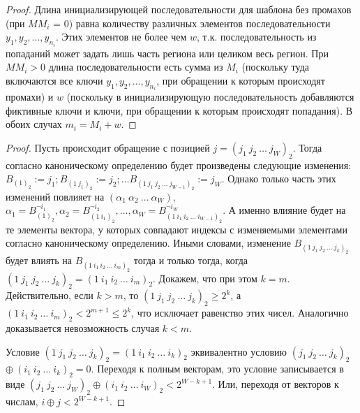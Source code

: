 \begin{proof}
  Длина инициализирующей последовательности для шаблона без промахов (при $MM_i$ = 0) равна количеству различных элементов последовательности $y_1, y_2, ..., y_{n_i}$. Этих элементов не более чем $w$,
  т.к. последовательность из попаданий может задать лишь часть региона
  или целиком весь регион. При $MM_i > 0$ длина последовательности
  есть сумма из $M_i$ (поскольку туда включаются все ключи $y_1, y_2,
  ..., y_{n_i}$, при обращении к которым происходят промахи) и
  $w$ (поскольку в инициализирующую последовательность добавляются фиктивные ключи и ключи, при обращении к которым происходят попадания). В обоих случах $m_i = M_i + w$.
\end{proof}

\theoremtext{\ref{thm_pseudoLRU_invariant}}{\PseudoLRUInvariant}
\begin{proof}
  Пусть происходит обращение с позицией $j = (j_1~j_2~\dots~j_W)_2$.
  Тогда согласно каноническому определению \PseudoLRU будет
  произведены следующие изменения: $B_{(1)_2} := j_1; B_{(1~j_1)_2} := j_2; \dots B_{(1~j_1~j_2~\dots~j_{W-1})_2} := j_W$. Однако только часть этих изменений повлияет на
  $(\alpha_1~\alpha_2~\dots~\alpha_W)$, $\alpha_1 = B_{(1)_2}^{\neg i_1}, \alpha_2 = B_{(1~i_1)_2}^{\neg i_2}, \dots, \alpha_W = B_{(1~i_1~i_2~\dots~i_{W-1})_2}^{\neg i_W}$. А именно влияние будет на те элементы вектора, у которых совпадают индексы с изменяемыми элементами согласно каноническому определению. Иными словами,
  изменение $B_{(1~j_1~j_2~\dots~j_k)_2}$ будет влиять на
  $B_{(1~i_1~i_2~\dots~i_m)_2}$ тогда и только тогда, когда
  $(1~j_1~j_2~\dots~j_k)_2 = (1~i_1~i_2~\dots~i_m)_2$. Докажем, что при этом $k = m$. Действительно, если $k > m$, то
  $(1~j_1~j_2~\dots~j_k)_2 \geqslant 2^k$, а $(1~i_1~i_2~\dots~i_m)_2 < 2^{m+1} \leqslant 2^k$, что исключает равенство этих чисел.
  Аналогично доказывается невозможность случая $k < m$.

  Условие $(1~j_1~j_2~\dots~j_k)_2 = (1~i_1~i_2~\dots~i_k)_2$
  эквивалентно условию $(j_1~j_2~\dots~j_k)_2$ $\oplus~(i_1~i_2~\dots~i_k)_2 = 0$. Переходя к полным векторам, это условие записывается в виде $(j_1~j_2~\dots~j_W)_2 \oplus
  (i_1~i_2~\dots~i_W)_2 < 2^{W-k+1}$. Или, переходя от векторов к
  числам, $i \oplus j < 2^{W-k+1}$.


\end{proof}
